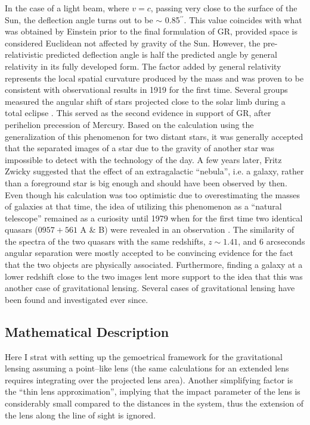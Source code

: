 \documentclass[paper=a4, fontsize=11pt]{scrartcl} %
\numberwithin{equation}{section} %
\numberwithin{figure}{section} %
\numberwithin{table}{section} %
\begin{document}
In the case of a light beam, where $v = c$, passing very close to the surface of the Sun, the deflection angle turns out to be $\sim$ 0.85$^{\prime \prime}$. This value coincides with what was obtained by Einstein prior to the final formulation of GR, provided space is considered Euclidean not affected by gravity of the Sun. However, the pre-relativistic predicted deflection angle is half the predicted angle by general relativity in its fully developed form. The factor added by general relativity represents the local spatial curvature produced by the mass and was proven to be consistent with observational results in 1919 for the first time. Several groups measured the angular shift of stars projected close to the solar limb during a total eclipse \citet{Eddington+1919}. This served as the second evidence in support of GR, after perihelion precession of Mercury. Based on the calculation using the generalization of this phenomenon for two distant stars, it was generally accepted that the separated images of a star due to the gravity of another star was impossible to detect with the technology of the day. A few years later, Fritz Zwicky suggested  \citep{Zwicky1937} that the effect of an extragalactic ``nebula'', i.e. a galaxy, rather than a foreground star is big enough and should have been observed by then. Even though his calculation was too optimistic due to overestimating the masses of galaxies at that time, the idea of utilizing this phenomenon as a ``natural telescope''  remained as a curiosity until 1979 when for the first time two identical quasars ($0957+561$ A \& B) were revealed in an observation \citep{1979}. The similarity of the spectra of the two quasars with the same redshifts, $z \sim 1.41$, and 6 arcseconds angular separation were mostly accepted to be convincing evidence for the fact that the two objects are physically associated. Furthermore, finding a galaxy at a lower redshift close to the two images lent more support to the idea that this was another case of gravitational lensing. Several cases of gravitational lensing have been found and investigated ever since.

\subsection{Mathematical Description}
Here I strat with setting up the gemoetrical framework for the gravitational lensing assuming a point--like lens (the same calculations for an extended lens requires integrating over the projected lens area). Another simplifying factor is the ``thin lens approximation'', implying that the impact parameter of the lens is considerably small compared to the distances in the system, thus the extension of the lens along the line of sight is ignored.
\end{document}
